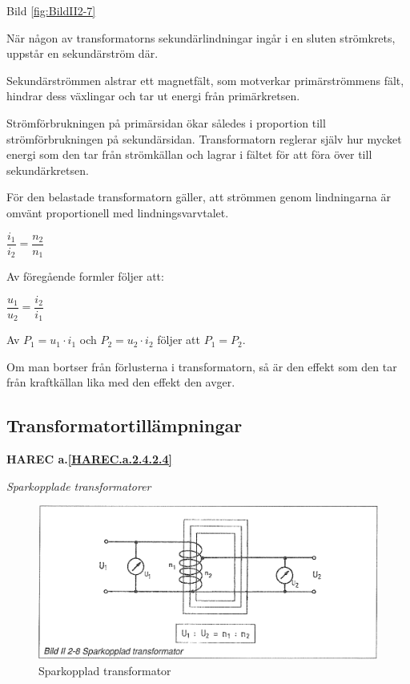 Bild \ref{fig:BildII2-7}

När någon av transformatorns sekundärlindningar ingår i en sluten strömkrets,
uppstår en sekundärström där.

Sekundärströmmen alstrar ett magnetfält, som motverkar primärströmmens fält,
hindrar dess växlingar och tar ut energi från primärkretsen.

Strömförbrukningen på primärsidan ökar således i proportion till
strömförbrukningen på sekundärsidan. Transformatorn reglerar själv hur mycket
energi som den tar från strömkällan och lagrar i fältet för att föra över
till sekundärkretsen.

För den belastade transformatorn gäller, att strömmen genom lindningarna är
omvänt proportionell med lindningsvarvtalet.

\(\dfrac{i_1}{i_2} = \dfrac{n_2}{n_1}\)

Av föregående formler följer att:

\(\dfrac{u_1}{u_2} = \dfrac{i_2}{i_1}\)

Av \(P_1 = u_1 \cdot i_1\) och \(P_2 = u_2 \cdot i_2\) följer att \(P_1 = P_2\).

Om man bortser från förlusterna i transformatorn, så är den effekt som den tar
från kraftkällan lika med den effekt den avger.

\subsection{Transformatortillämpningar}
\textbf{HAREC a.\ref{HAREC.a.2.4.2.4}\label{myHAREC.a.2.4.2.4}}

\emph{Sparkopplade transformatorer}

\begin{figure}[h]
\begin{center}
\includegraphics[width=\textwidth]{images/bild_2_2-08}
\caption{Sparkopplad transformator}
\label{fig:BildII2-8}
\end{center}
\end{figure}

